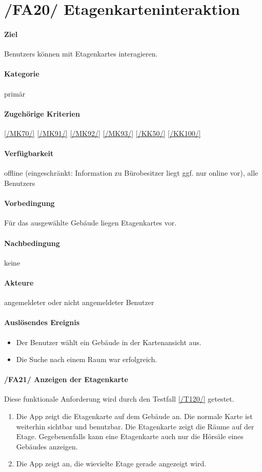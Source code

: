 \section[Etagenkarteninteraktion]{/FA20/ Etagenkarteninteraktion}
\label{/FA20/}
\paragraph{Ziel}
\Glspl{Benutzer} können mit \Glspl{Etagenkarte} interagieren.
\paragraph{Kategorie}
primär
\paragraph{Zugehörige Kriterien}
\ref{/MK70/} \ref{/MK91/} \ref{/MK92/} \ref{/MK93/} \ref{/KK50/} \ref{/KK100/}
\paragraph{Verfügbarkeit}
\gls{offline} (eingeschränkt: Information zu Bürobesitzer liegt ggf. nur online vor), alle \Glspl{Benutzer}
\paragraph{Vorbedingung}
Für das ausgewählte Gebäude liegen \Glspl{Etagenkarte} vor.
\paragraph{Nachbedingung}
keine
\paragraph{Akteure}
angemeldeter oder nicht angemeldeter \Gls{Benutzer}
\paragraph{Auslösendes Ereignis}
\begin{itemize}
    \item Der \Gls{Benutzer} wählt ein Gebäude in der \Gls{Kartenansicht} aus.
    \item Die Suche nach einem Raum war erfolgreich.
\end{itemize}
 
\paragraph{/FA21/ Anzeigen der Etagenkarte}
\label{/FA21/}
\hfill \break
Diese funktionale Anforderung wird durch den Testfall \ref{/T120/} getestet.
\begin{enumerate}
    \item Die App zeigt die \Gls{Etagenkarte} auf dem Gebäude an. Die normale \Gls{Karte} ist weiterhin sichtbar und benutzbar. Die \Gls{Etagenkarte} zeigt die Räume auf der Etage. Gegebenenfalls kann eine \Gls{Etagenkarte} auch nur die Hörsäle eines Gebäudes anzeigen.
    \item Die App zeigt an, die wievielte Etage gerade angezeigt wird.
\end{enumerate}
